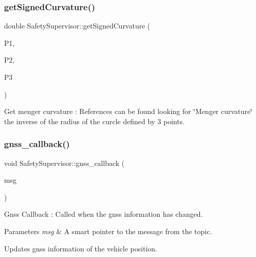 \mbox{\label{classSafetySupervisor_acf563289dfe4104f880ec73f71f9dbb1}} 
\subsubsection{\texorpdfstring{get\+Signed\+Curvature()}{getSignedCurvature()}}
{\footnotesize\ttfamily double Safety\+Supervisor\+::get\+Signed\+Curvature (\begin{DoxyParamCaption}\item[{const Planner\+H\+N\+S\+::\+Way\+Point \&}]{P1,  }\item[{const Planner\+H\+N\+S\+::\+Way\+Point \&}]{P2,  }\item[{const Planner\+H\+N\+S\+::\+Way\+Point \&}]{P3 }\end{DoxyParamCaption})\hspace{0.3cm}{\ttfamily [inline]}}



Get menger curvature \+: References can be found looking for \char`\"{}\+Menger curvature\char`\"{}  the inverse of the radius of the curcle defined by 3 points. 

\mbox{\label{classSafetySupervisor_a3fad879a3b629936c17db22a22269d27}} 
\subsubsection{\texorpdfstring{gnss\+\_\+callback()}{gnss\_callback()}}
{\footnotesize\ttfamily void Safety\+Supervisor\+::gnss\+\_\+callback (\begin{DoxyParamCaption}\item[{const geometry\+\_\+msgs\+::\+Pose\+Stamped\+::\+Const\+Ptr \&}]{msg }\end{DoxyParamCaption})\hspace{0.3cm}{\ttfamily [inline]}}



Gnss Callback \+: Called when the gnss information has changed. 


\begin{DoxyParams}{Parameters}
{\em msg} & A smart pointer to the message from the topic.\\
\hline
\end{DoxyParams}
Updates gnss information of the vehicle position. \mbox{\label{classSafetySupervisor_ad2c0a23d1e8b843e6e74ccea633e993c}} 
